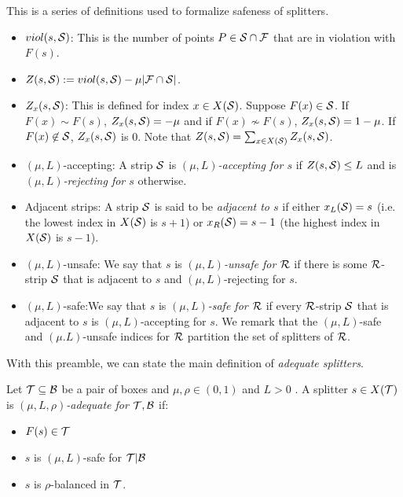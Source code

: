 \documentclass{acmsmall}
\newcommand{\cB}{{\cal B}}
\newcommand{\cF}{{\cal F}}
\newcommand{\cR}{{\cal R}}
\newcommand{\cS}{{\cal S}}
\newcommand{\cT}{{\cal T}}
\newcommand{\strip}[2]{#1|#2}
\begin{document}
\begin{definition} \label{def:safe} This is a series of definitions used to formalize safeness of splitters.
 \begin{itemize}
\item $viol(s,\cS)$: This is the number of points $P \in \cS \cap \cF$ that are in violation with
$F(s)$.
\item $Z(s,\cS) := viol(s,\cS)-\mu|\cF \cap \cS|$.  
\item $Z_x(s,\cS)$: This is defined for index $x \in X(\cS)$. Suppose $F(x) \in \cS$. If $F(x) \sim F(s)$, $Z_x(s,\cS)=-\mu$
and if $F(x) \not\sim F(s)$, $Z_x(s,\cS)=1-\mu$.  If $F(x) \not \in \cS$, $Z_x(s,\cS)$ is 0.
Note that $Z(s,\cS) = \sum_{x \in X(\cS)} Z_x(s,\cS)$.
\item  $(\mu,L)$-accepting: A strip $\cS$ is {\em $(\mu,L)$-accepting for $s$} if $Z(s,\cS)\leq L$ and is
{\em $(\mu,L)$-rejecting for $s$} otherwise.
\item Adjacent strips: A strip $\cS$ is said to be {\em adjacent to $s$} if either $x_L(\cS)=s$ (i.e. the lowest index  in  $X(\cS)$ is $s+1$)
or $x_R(\cS)=s-1$ (the highest index in $X(\cS)$ is $s-1$).   
\item $(\mu,L)$-unsafe: We say that $s$  is {\em $(\mu,L)$-unsafe  for $\cR$}  if there is
some $\cR$-strip $\cS$ that is  adjacent to $s$  and $(\mu,L)$-rejecting for
$s$.  
\item $(\mu,L)$-safe:We say that $s$ is {\em $(\mu,L)$-safe for $\cR$} if every $\cR$-strip $\cS$ that is adjacent to $s$
is $(\mu,L)$-accepting for $s$. We remark that the $(\mu,L)$-safe and $(\mu.L)$-unsafe indices for $\cR$ partition the set of splitters of $\cR$.
\end{itemize}
\end{definition}

With this preamble, we can state the main definition of \emph{adequate splitters}.

\begin{definition} Let $\cT \subseteq \cB$ be a pair of boxes and $\mu,\rho \in (0,1)$ and $L>0$ .
A splitter $s \in X(\cT)$ is {\em $(\mu,L,\rho)$-adequate for $\cT,\cB$} if:
%
\begin{itemize}
\item $F(s) \in \cT$
\item $s$ is $(\mu,L)$-safe for $\strip{\cT}{\cB}$
\item $s$ is $\rho$-balanced in $\cT$.
\end{itemize}
\end{definition}
\end{document}
